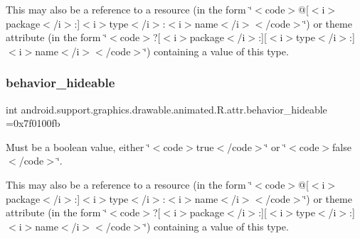 This may also be a reference to a resource (in the form \char`\"{}$<$code$>$@\mbox{[}$<$i$>$package$<$/i$>$\+:\mbox{]}$<$i$>$type$<$/i$>$\+:$<$i$>$name$<$/i$>$$<$/code$>$\char`\"{}) or theme attribute (in the form \char`\"{}$<$code$>$?\mbox{[}$<$i$>$package$<$/i$>$\+:\mbox{]}\mbox{[}$<$i$>$type$<$/i$>$\+:\mbox{]}$<$i$>$name$<$/i$>$$<$/code$>$\char`\"{}) containing a value of this type. \mbox{\label{classandroid_1_1support_1_1graphics_1_1drawable_1_1animated_1_1R_1_1attr_ac91c5005e6964e37f221af84cff9e08c}} 
\subsubsection{\texorpdfstring{behavior\+\_\+hideable}{behavior\_hideable}}
{\footnotesize\ttfamily int android.\+support.\+graphics.\+drawable.\+animated.\+R.\+attr.\+behavior\+\_\+hideable =0x7f0100fb\hspace{0.3cm}{\ttfamily [static]}}

Must be a boolean value, either \char`\"{}$<$code$>$true$<$/code$>$\char`\"{} or \char`\"{}$<$code$>$false$<$/code$>$\char`\"{}. 

This may also be a reference to a resource (in the form \char`\"{}$<$code$>$@\mbox{[}$<$i$>$package$<$/i$>$\+:\mbox{]}$<$i$>$type$<$/i$>$\+:$<$i$>$name$<$/i$>$$<$/code$>$\char`\"{}) or theme attribute (in the form \char`\"{}$<$code$>$?\mbox{[}$<$i$>$package$<$/i$>$\+:\mbox{]}\mbox{[}$<$i$>$type$<$/i$>$\+:\mbox{]}$<$i$>$name$<$/i$>$$<$/code$>$\char`\"{}) containing a value of this type. \mbox{\label{classandroid_1_1support_1_1graphics_1_1drawable_1_1animated_1_1R_1_1attr_a099a1a029952ff1934e5f43dfa0c3dac}} 

